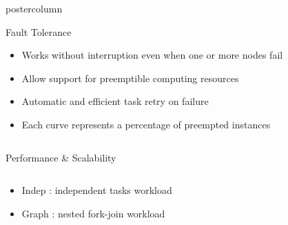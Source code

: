 \begin{frame}[fragile]
\begin{columns}[T]
    \begin{column}{.49\textwidth}
      \begin{beamercolorbox}[center,wd=\textwidth]{postercolumn}
        \begin{minipage}[T]{.96\textwidth}
            \begin{block}{Fault Tolerance}
              \begin{itemize}
              \item Works without interruption even when one or more nodes fail
              \item Allow support for preemptible computing resources
              \item Automatic and efficient task retry on failure
              \item Each curve represents a percentage of preempted instances
              \end{itemize}
              \begin{figure}
                \centering
                
              \end{figure}
            \end{block}
        \end{minipage}
      \end{beamercolorbox}
    \end{column}
  \end{columns}



  \begin{center}
  \begin{minipage}[T]{.975\textwidth}
  \begin{block}{Performance \& Scalability}
    \begin{columns}[T]
      \begin{column}{.49\textwidth}
      \begin{itemize}
        \item Indep : independent tasks workload
        \item Graph : nested fork-join workload
      \end{itemize}
      \begin{figure}
      \centering
      
      \end{figure}
      \end{column}


\end{columns}
\end{block}
\end{minipage}
\end{center}
\end{frame}
